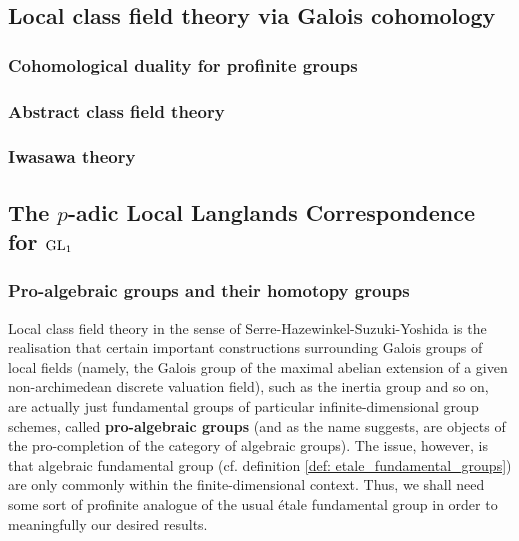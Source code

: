         \subsection{Local class field theory via Galois cohomology}
            \subsubsection{Cohomological duality for profinite groups}
            
            \subsubsection{Abstract class field theory}
            
            \subsubsection{Iwasawa theory}
    
        \subsection{The \texorpdfstring{$p$}{}-adic Local Langlands Correspondence for \texorpdfstring{$\operatorname{GL}_1$}{}}
            \subsubsection{Pro-algebraic groups and their homotopy groups}
                Local class field theory in the sense of Serre-Hazewinkel-Suzuki-Yoshida is the realisation that certain important constructions surrounding Galois groups of local fields (namely, the Galois group of the maximal abelian extension of a given non-archimedean discrete valuation field), such as the inertia group and so on, are actually just fundamental groups of particular infinite-dimensional group schemes, called \textbf{pro-algebraic groups} (and as the name suggests, are objects of the pro-completion of the category of algebraic groups). The issue, however, is that algebraic fundamental group (cf. definition \ref{def: etale_fundamental_groups}) are only commonly within the finite-dimensional context. Thus, we shall need some sort of profinite analogue of the usual \'etale fundamental group in order to meaningfully our desired results.
                
